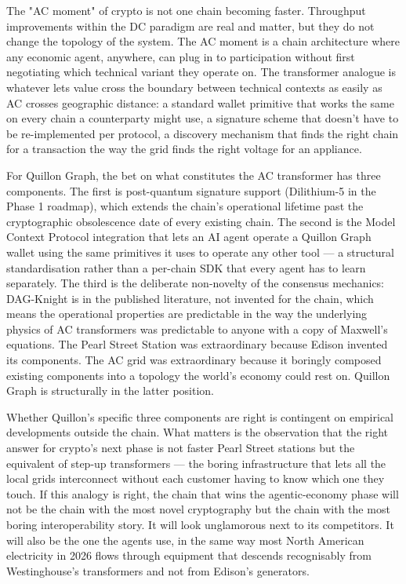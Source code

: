 \documentclass[11pt,a4paper]{article}
\begin{document}
The "AC moment" of crypto is not one chain becoming faster. Throughput
improvements within the DC paradigm are real and matter, but they do not
change the topology of the system. The AC moment is a chain architecture
where any economic agent, anywhere, can plug in to participation without
first negotiating which technical variant they operate on. The
transformer analogue is whatever lets value cross the boundary between
technical contexts as easily as AC crosses geographic distance: a
standard wallet primitive that works the same on every chain a
counterparty might use, a signature scheme that doesn't have to be
re-implemented per protocol, a discovery mechanism that finds the right
chain for a transaction the way the grid finds the right voltage for an
appliance.

For Quillon Graph, the bet on what constitutes the AC transformer has
three components. The first is post-quantum signature support
(Dilithium-5 in the Phase 1 roadmap), which extends the chain's
operational lifetime past the cryptographic obsolescence date of every
existing chain. The second is the Model Context Protocol integration
that lets an AI agent operate a Quillon Graph wallet using the same
primitives it uses to operate any other tool --- a structural
standardisation rather than a per-chain SDK that every agent has to learn
separately. The third is the deliberate non-novelty of the consensus
mechanics: DAG-Knight is in the published literature, not invented for
the chain, which means the operational properties are predictable in the
way the underlying physics of AC transformers was predictable to anyone
with a copy of Maxwell's equations. The Pearl Street Station was
extraordinary because Edison invented its components. The AC grid was
extraordinary because it boringly composed existing components into a
topology the world's economy could rest on. Quillon Graph is structurally
in the latter position.

Whether Quillon's specific three components are right is contingent on
empirical developments outside the chain. What matters is the
observation that the right answer for crypto's next phase is not faster
Pearl Street stations but the equivalent of step-up transformers --- the
boring infrastructure that lets all the local grids interconnect without
each customer having to know which one they touch. If this analogy is
right, the chain that wins the agentic-economy phase will not be the
chain with the most novel cryptography but the chain with the most boring
interoperability story. It will look unglamorous next to its competitors.
It will also be the one the agents use, in the same way most North
American electricity in 2026 flows through equipment that descends
recognisably from Westinghouse's transformers and not from Edison's
generators.
\end{document}

